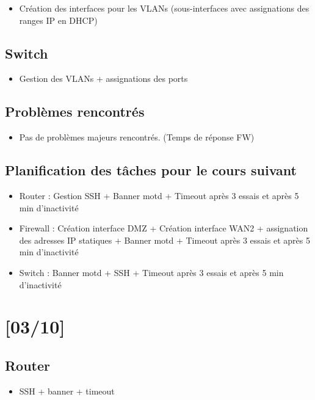 \documentclass{article}
\begin{document}
\begin{itemize}
\item Création des interfaces pour les VLANs (sous-interfaces avec assignations des ranges IP en DHCP)
\end{itemize} 
\subsection{Switch}

\begin{itemize}
\item Gestion des VLANs + assignations des ports
\end{itemize} 
\subsection{Problèmes rencontrés}
\begin{itemize}
\item Pas de problèmes majeurs rencontrés. (Temps de réponse FW)
\end{itemize} 
\subsection{Planification des tâches pour le cours suivant}
\begin{itemize}
\item Router : Gestion SSH + Banner motd + Timeout après 3 essais et après 5 min d'inactivité
\item Firewall : Création interface DMZ + Création interface WAN2 + assignation des adresses IP statiques + Banner motd + Timeout après 3 essais et après 5 min d'inactivité
\item Switch : Banner motd + SSH + Timeout après 3 essais et après 5 min d'inactivité
\end{itemize} 
\newpage
\section{[03/10]}

\subsection{Router}


\begin{itemize}

\item SSH + banner + timeout
\end{itemize} 
\end{document}
